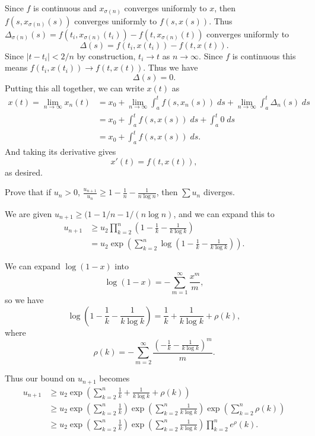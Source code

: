 \documentclass[10pt]{amsart}
\newenvironment{exercise}[1]{%
        \vspace{10mm}
        \renewcommand\themanualtheoreminner{#1}%
  \manualtheoreminner
}\hrulefill{\endmanualtheoreminner}
\begin{document}
Since $f$ is continuous and $x_{\sigma(n)}$ converges uniformly to $x$, then $f(s, x_{\sigma(n)}(s))$ converges uniformly to $f(s,x(s))$. Thus $\Delta_{\sigma(n)}(s) = f(t_i, x_{\sigma(n)}(t_i)) - f(t, x_{\sigma(n)}(t))$ converges uniformly to
\[
	\Delta(s) = f(t_i, x(t_i)) - f(t, x(t)).
\] Since $|t - t_i| < 2/n$ by construction, $t_i \to t$ as $n \to \infty$. Since $f$ is continuous this means $f(t_i, x(t_i)) \to f(t, x(t))$. Thus we have
\[
	\Delta(s) = 0.
\] 
Putting this all together, we can write $x(t)$ as
\begin{align*}
	x(t) = \lim_{n\to\infty} x_n(t) &= x_0 + \lim_{n \to \infty} \int_{a}^{t} f(s,x_n(s)) \;ds + \lim_{n \to \infty} \int_{a}^{t} \Delta_n(s) \;ds \\
					     &= x_0 + \int_{a}^{t} f(s,x(s)) \;ds + \int_{a}^{t} 0 \;ds \\
					     &= x_0 + \int_{a}^{t} f(s,x(s)) \;ds.
\end{align*}
And taking its derivative gives
\[
	x'(t) = f(t, x(t)),
\] as desired.

\begin{exercise}{Page 324, Ex. 58b}
	Prove that if $u_n > 0$, $\frac{u_{n+1}}{u_n} \geq 1 - \frac{1}{n} - \frac{1}{n \log n} $, then $\sum u_n$ diverges.
\end{exercise}

We are given $u_{n+1}\geq (1- 1/n - 1/(n \log n)$, and we can expand this to
\begin{align*}
	u_{n+1} &\geq u_2 \prod_{k=2}^n \left(1-\frac{1}{k} -\frac{1}{k \log k} \right) \\
		&= u_2 \exp\left( \sum_{k=2}^{n} \log\left( 1 -\frac{1}{k} -\frac{1}{k\log k} \right) \right).
\end{align*}

We can expand $\log(1-x)$ into
\[
	\log(1-x) = -\sum_{m=1}^{\infty} \frac{x^m}{m},
\] so we have
\[
	\log\left(1-\frac{1}{k} -\frac{1}{k \log k} \right) = \frac{1}{k} + \frac{1}{k\log k} + \rho(k),
\] 
where
\[
	\rho(k) = -\sum_{m=2}^{\infty} \frac{\left( -\frac{1}{k} -\frac{1}{k\log k}  \right)^m}{m} .
\] 

Thus our bound on $u_{n+1}$ becomes
\begin{align*}
	u_{n+1} &\geq u_2 \exp\left( \sum_{k=2}^{n} \frac{1}{k} + \frac{1}{k\log k} + \rho(k) \right) \\
	&\geq u_2 \exp\left( \sum_{k=2}^{n} \frac{1}{k} \right)  \exp\left( \sum_{k=2}^{n} \frac{1}{k \log k}  \right)  \exp\left( \sum_{k=2}^{n} \rho(k)  \right) \\
	&\geq u_2 \exp\left( \sum_{k=2}^{n} \frac{1}{k} \right)  \exp\left( \sum_{k=2}^{n} \frac{1}{k \log k}  \right)  \prod_{k=2}^n e^\rho(k).
\end{align*}
\end{document}
